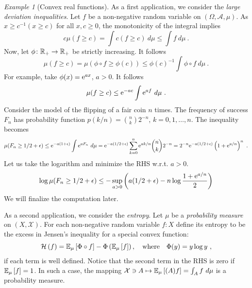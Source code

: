 \documentclass[12pt,a4paper]{amsart}
\theoremstyle{plain}%
\theoremstyle{definition}
\theoremstyle{remark}
\newtheorem{example}{Example}
\begin{document}
\begin{example}[Convex real functions]
As a first application, we consider the \emph{large deviation
  inequalities}. Let $f$ be a non-negative random variable on
$(\Omega,\mathcal A,\mu)$. As $x \geq c^{-1}(x \geq c)$ for all $x,c
\geq 0$, the monotonicity of the integral implies
\begin{equation*}
  c \mu(f \geq c) = \int c (f \geq c) \ d\mu \leq \int f \ d\mu \ .
\end{equation*}
Now, let $\phi \colon \mathbb{R}_+ \to \mathbb{R}_+$ be strictly
increasing. It follows
\begin{equation*}
  \mu(f \geq c) = \mu(\phi\circ f \geq \phi(c)) \leq \phi(c)^{-1}
  \int \phi\circ f \ d\mu \ . 
\end{equation*}
For example, take $\phi(x) = \mathrm{e}^{ax}$, $a > 0$. It follows
\begin{equation*}
  \mu(f \geq c) \leq \mathrm{e}^{-ac} \int \mathrm{e}^{af} \ d\mu \ . 
\end{equation*}
Consider the model of the flipping of a fair coin $n$ times. The frequency of success $F_n$ has probability function $p(k/n) = \binom n k 2^{-n}$, $k=0,1,\dots,n$. The inequality becomes
\begin{equation*}
  \mu(F_n \geq 1/2 + \epsilon) \leq \mathrm{e}^{-a(1+\epsilon)} \int \mathrm{e}^{a F_n} \ d\mu =
  \mathrm{e}^{-a(1/2+\epsilon)} \sum_{k=0}^n \mathrm{e}^{ak/n} \binom n k 2^{-n} = 2^{-n}
  \mathrm{e}^{-a(1/2+\epsilon)} \left(1 + \mathrm{e}^{a/n}\right)^n \ .
\end{equation*}
Let us take the logarithm and minimize the RHS w.r.t. $a > 0$.
\begin{equation}\label{eq:LD-1}
  \log \mu(F_n \geq 1/2+\epsilon) \leq - \sup_{a > 0} \left(a(1/2 + \epsilon) - n \log\frac{1+\mathrm{e}^{a/n}}2\right)
\end{equation}
We will finalize the computation later.

As a second application, we consider the \emph{entropy}. Let $\mu$ be a \emph{probability measure} on
$(X,\mathcal X)$. For each non-negative random variable $f \colon X$
define its entropy to be the excess in Jensen's inequality for a special convex function:
\begin{equation*}
  \entropyof{f} = \expectat \mu {\Phi\circ f} - \Phi\left(\expectat
    \mu f\right), \quad \text{where} \quad \Phi(y) = y \log y \ ,
\end{equation*}
if each term is well defined. Notice that the second term in the RHS is zero if $\operatorname{\mathbb E}_{\mu}\left[f\right] = 1$. In such a case, the mapping $\mathcal X \ni A \mapsto \operatorname{\mathbb E}_{\mu}\left[(A)f\right] = \int _A f \ d\mu$ is a probability measure.


\end{example}
\end{document}
